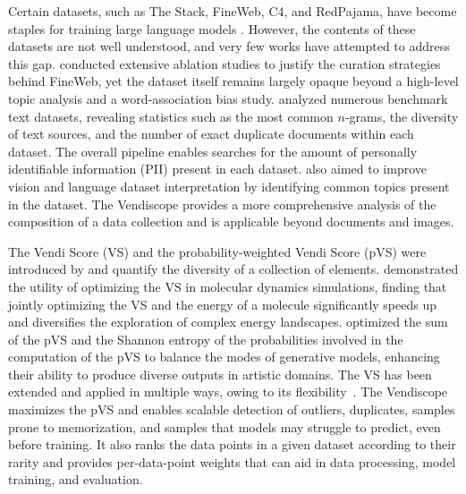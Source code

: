  Certain datasets, such as The Stack, FineWeb, C4, and RedPajama, have become staples for training large language models \citep{kocetkov2022stack, penedo2024fineweb, webster2021person}. However, the contents of these datasets are not well understood, and very few works have attempted to address this gap. \citet{penedo2024fineweb} conducted extensive ablation studies to justify the curation strategies behind FineWeb, yet the dataset itself remains largely opaque beyond a high-level topic analysis and a word-association bias study. \citet{elazar2023s} analyzed numerous benchmark text datasets, revealing statistics such as the most common $n$-grams, the diversity of text sources, and the number of exact duplicate documents within each dataset. The overall pipeline enables searches for the amount of personally identifiable information (PII) present in each dataset. \citet{zhong2024explaining} also aimed to improve vision and language dataset interpretation by identifying common topics present in the dataset. The Vendiscope provides a more comprehensive analysis of the composition of a data collection and is applicable beyond documents and images.

The Vendi Score (VS) and the probability-weighted Vendi Score (pVS) were introduced by \cite{friedman2023vendi} and quantify the diversity of a collection of elements. \citet{pasarkar2023vendi} demonstrated the utility of optimizing the VS in molecular dynamics simulations, finding that jointly optimizing the VS and the energy of a molecule significantly speeds up and diversifies the exploration of complex energy landscapes. \cite{berns2023towards} optimized the sum of the pVS and the Shannon entropy of the probabilities involved in the computation of the pVS to balance the modes of generative models, enhancing their ability to produce diverse outputs in artistic domains. The VS has been extended and applied in multiple ways, owing to its flexibility~\citep{askari2024improving, kannen2024beyond,liu2024diversity,nguyen2024quality, mousavi2024vsi, pasarkar2024cousins, rezaei2025alpha, bhardwaj2025robust}. The Vendiscope maximizes the pVS and enables scalable detection of outliers, duplicates, samples prone to memorization, and samples that models may struggle to predict, even before training. It also ranks the data points in a given dataset according to their rarity and provides per-data-point weights that can aid in data processing, model training, and evaluation.


